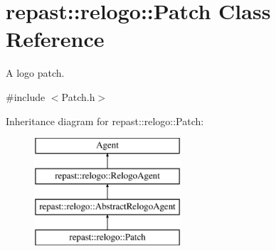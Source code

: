 \hypertarget{classrepast_1_1relogo_1_1_patch}{\section{repast\-:\-:relogo\-:\-:Patch Class Reference}
\label{classrepast_1_1relogo_1_1_patch}
}


A logo patch.  




{\ttfamily \#include $<$Patch.\-h$>$}

Inheritance diagram for repast\-:\-:relogo\-:\-:Patch\-:\begin{figure}[H]
\begin{center}
\leavevmode
\includegraphics[height=4.000000cm]{classrepast_1_1relogo_1_1_patch}
\end{center}
\end{figure}
